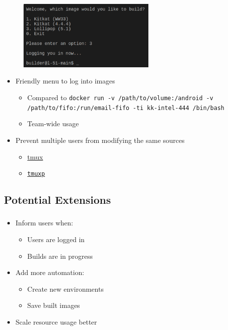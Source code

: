 \documentclass[10pt]{beamer}
\makeatletter
\newcommand*{\currentname}{\@currentlabelname}
\makeatother
\begin{document}
\begin{frame}
	\frametitle{\currentname}

	\begin{figure}[c]
		\includegraphics[width=0.6\textwidth]{./images/projects-docker_android_ia.png}
		\\
	\end{figure}

	\begin{itemize}
		\item Friendly menu to log into images
			\begin{itemize}
				\item Compared to \texttt{docker run -v /path/to/volume:/android -v /path/to/fifo:/run/email-fifo -ti kk-intel-444 /bin/bash}
				\item Team-wide usage
			\end{itemize}

		\item Prevent multiple users from modifying the same sources
		\begin{itemize}
			\item \href{http://tmux.github.io/}{tmux}
			\item \href{https://pypi.python.org/pypi/tmuxp}{\texttt{tmuxp}}
		\end{itemize}
	\end{itemize}
\end{frame}

\subsection{Potential Extensions}
\begin{frame}
	\frametitle{\currentname}

	\begin{itemize}
		\item Inform users when:
			\begin{itemize}
				\item Users are logged in
				\item Builds are in progress
			\end{itemize}

		\item Add more automation:
			\begin{itemize}
				\item Create new environments
				\item Save built images  
			\end{itemize}

		\item Scale resource usage better
	\end{itemize}
\end{frame}
\end{document}
